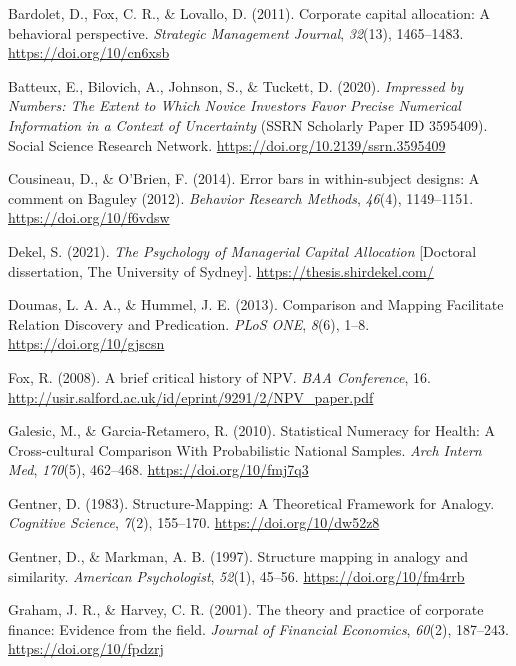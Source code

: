 \documentclass[
  english,
  man, donotrepeattitle,floatsintext]{apa7}
\newlength{\cslhangindent}
\newenvironment{cslreferences}%
  {\setlength{\parindent}{0pt}%
  \everypar{\setlength{\hangindent}{\cslhangindent}}\ignorespaces}%
  {\par}
\theoremstyle{definition}
\theoremstyle{definition}
\theoremstyle{definition}
\theoremstyle{definition}
\theoremstyle{remark}
\begin{document}
\hypertarget{refs}{}
\begin{cslreferences}
\leavevmode\hypertarget{ref-bardolet2011}{}%
Bardolet, D., Fox, C. R., \& Lovallo, D. (2011). Corporate capital allocation: A behavioral perspective. \emph{Strategic Management Journal}, \emph{32}(13), 1465--1483. \url{https://doi.org/10/cn6xsb}

\leavevmode\hypertarget{ref-batteux2020}{}%
Batteux, E., Bilovich, A., Johnson, S., \& Tuckett, D. (2020). \emph{Impressed by Numbers: The Extent to Which Novice Investors Favor Precise Numerical Information in a Context of Uncertainty} (SSRN Scholarly Paper ID 3595409). Social Science Research Network. \url{https://doi.org/10.2139/ssrn.3595409}

\leavevmode\hypertarget{ref-cousineau2014}{}%
Cousineau, D., \& O'Brien, F. (2014). Error bars in within-subject designs: A comment on Baguley (2012). \emph{Behavior Research Methods}, \emph{46}(4), 1149--1151. \url{https://doi.org/10/f6vdsw}

\leavevmode\hypertarget{ref-dekel2021b}{}%
Dekel, S. (2021). \emph{The Psychology of Managerial Capital Allocation} {[}Doctoral dissertation, The University of Sydney{]}. \url{https://thesis.shirdekel.com/}

\leavevmode\hypertarget{ref-doumas2013}{}%
Doumas, L. A. A., \& Hummel, J. E. (2013). Comparison and Mapping Facilitate Relation Discovery and Predication. \emph{PLoS ONE}, \emph{8}(6), 1--8. \url{https://doi.org/10/gjscsn}

\leavevmode\hypertarget{ref-fox2008}{}%
Fox, R. (2008). A brief critical history of NPV. \emph{BAA Conference}, 16. \url{http://usir.salford.ac.uk/id/eprint/9291/2/NPV_paper.pdf}

\leavevmode\hypertarget{ref-galesic2010}{}%
Galesic, M., \& Garcia-Retamero, R. (2010). Statistical Numeracy for Health: A Cross-cultural Comparison With Probabilistic National Samples. \emph{Arch Intern Med}, \emph{170}(5), 462--468. \url{https://doi.org/10/fmj7q3}

\leavevmode\hypertarget{ref-gentner1983}{}%
Gentner, D. (1983). Structure-Mapping: A Theoretical Framework for Analogy. \emph{Cognitive Science}, \emph{7}(2), 155--170. \url{https://doi.org/10/dw52z8}

\leavevmode\hypertarget{ref-gentner1997}{}%
Gentner, D., \& Markman, A. B. (1997). Structure mapping in analogy and similarity. \emph{American Psychologist}, \emph{52}(1), 45--56. \url{https://doi.org/10/fm4rrb}

\leavevmode\hypertarget{ref-graham2001}{}%
Graham, J. R., \& Harvey, C. R. (2001). The theory and practice of corporate finance: Evidence from the field. \emph{Journal of Financial Economics}, \emph{60}(2), 187--243. \url{https://doi.org/10/fpdzrj}


\end{cslreferences}
\end{document}
